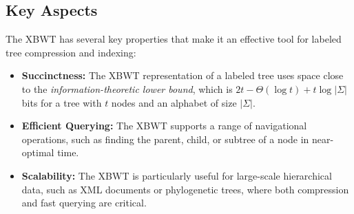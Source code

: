 \subsection{Key Aspects}
The XBWT has several key properties that make it an effective tool for labeled tree compression and indexing:
\begin{itemize}
    \item \textbf{Succinctness:} The XBWT representation of a labeled tree uses space close to the \emph{information-theoretic lower bound}, which is \( 2t - \Theta(\log t) + t \log |\Sigma| \) bits for a tree with $t$ nodes and an alphabet of size $|\Sigma|$.
    \item \textbf{Efficient Querying:} The XBWT supports a range of navigational operations, such as finding the parent, child, or subtree of a node in near-optimal time.
    \item \textbf{Scalability:} The XBWT is particularly useful for large-scale hierarchical data, such as XML documents or phylogenetic trees, where both compression and fast querying are critical.
\end{itemize}

